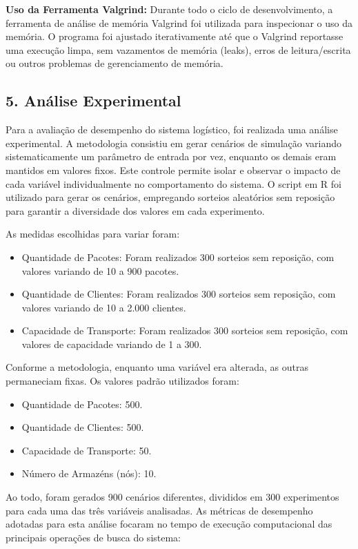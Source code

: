 \documentclass[
  12pt,
]{article}
\begin{document}
\textbf{Uso da Ferramenta Valgrind:} Durante todo o ciclo de
desenvolvimento, a ferramenta de análise de memória Valgrind foi
utilizada para inspecionar o uso da memória. O programa foi ajustado
iterativamente até que o Valgrind reportasse uma execução limpa, sem
vazamentos de memória (leaks), erros de leitura/escrita ou outros
problemas de gerenciamento de memória.

\subsection{5. Análise Experimental}\label{anuxe1lise-experimental}

Para a avaliação de desempenho do sistema logístico, foi realizada uma
análise experimental. A metodologia consistiu em gerar cenários de
simulação variando sistematicamente um parâmetro de entrada por vez,
enquanto os demais eram mantidos em valores fixos. Este controle permite
isolar e observar o impacto de cada variável individualmente no
comportamento do sistema. O script em R foi utilizado para gerar os
cenários, empregando sorteios aleatórios sem reposição para garantir a
diversidade dos valores em cada experimento.

As medidas escolhidas para variar foram:

\begin{itemize}
\item
  Quantidade de Pacotes: Foram realizados 300 sorteios sem reposição,
  com valores variando de 10 a 900 pacotes.
\item
  Quantidade de Clientes: Foram realizados 300 sorteios sem reposição,
  com valores variando de 10 a 2.000 clientes.
\item
  Capacidade de Transporte: Foram realizados 300 sorteios sem reposição,
  com valores de capacidade variando de 1 a 300.
\end{itemize}

Conforme a metodologia, enquanto uma variável era alterada, as outras
permaneciam fixas. Os valores padrão utilizados foram:

\begin{itemize}
\item
  Quantidade de Pacotes: 500.
\item
  Quantidade de Clientes: 500.
\item
  Capacidade de Transporte: 50.
\item
  Número de Armazéns (nós): 10.
\end{itemize}

Ao todo, foram gerados 900 cenários diferentes, divididos em 300
experimentos para cada uma das três variáveis analisadas. As métricas de
desempenho adotadas para esta análise focaram no tempo de execução
computacional das principais operações de busca do sistema:
\end{document}
